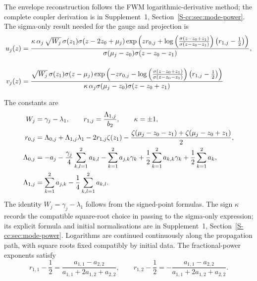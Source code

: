 \documentclass{optica-article}
\numberwithin{equation}{section}
\begin{document}
The envelope reconstruction follows the FWM logarithmic-derivative method; the complete coupler derivation is in Supplement~1, Section~\ref*{S-cc:sec:mode-power}.
The sigma-only result needed for the gauge and projection is
\begin{align}
u_j{\left(z\right)} &= \frac{\kappa\, \alpha_j\,\sqrt{W_j} \,\sigma{\left(z_1\right)}\sigma{\left(z - 2 z_{0} + {\mu}_{j} \right)} \exp\left(z {r}_{0,j} + \log{\left(\frac{\sigma{\left(z - z_{0} + z_{1} \right)}}{\sigma{\left(z - z_{0} - z_{1} \right)}} \right)} \left({r}_{1,j} - \frac{1}{2}\right)\right)}{ \sigma{\left({\mu}_{j} - z_{0}\right)} \sigma{\left(z - z_{0}  - z_1\right)}}, \notag \\[12pt]
v_j{\left(z\right)} &= \frac{\sqrt{W_j} \,  \sigma{\left(z_1\right)}\sigma{\left(z - {\mu}_{j} \right)} \exp\left(- z {r}_{0,j} - \log{\left(\frac{\sigma{\left(z - z_{0} + z_{1} \right)}}{\sigma{\left(z - z_{0} - z_{1} \right)}} \right)}  \left({r}_{1,j} - \frac{1}{2}\right) \right)}{\kappa \,\alpha_j \sigma{\left({\mu}_{j} - z_{0}\right)} \sigma{\left(z - z_{0} + z_1\right)}} \label{cc:eq:u-v-quartic-no-wp-sqrt}
\end{align}

The constants are
\begin{align}
W_j&=\gamma_j-\lambda_1,\qquad r_{1,j}=\frac{\Lambda_{1,j}}{b_2},\qquad \kappa=\pm1,\notag\\
r_{0,j}&=\Lambda_{0,j}+\Lambda_{1,j}\lambda_1-2r_{1,j}\zeta(z_1)
-\frac{\zeta(\mu_j-z_0-z_1)+\zeta(\mu_j-z_0+z_1)}2,\notag\\
\Lambda_{0,j}&=-a_j-\frac{\gamma_j}{4}\sum_{k,l=1}^2a_{k,l}
-\sum_{k=1}^2a_{j,k}\gamma_k+\frac12\sum_{k=1}^2a_{k,k}\gamma_k+\frac12\sum_{k=1}^2a_k,\notag\\
\Lambda_{1,j}&=\sum_{k=1}^2a_{j,k}-\frac14\sum_{k,l=1}^2a_{k,l}.
\label{cc:eq:envelope-constants}
\end{align}
The identity $W_j=\gamma_j-\lambda_1$ follows from the signed-point formulas.
The sign $\kappa$ records the compatible square-root choice in passing to the sigma-only expression; its explicit formula and initial normalisations are in Supplement~1, Section~\ref*{S-cc:sec:mode-power}.
Logarithms are continued continuously along the propagation path, with square roots fixed compatibly by initial data.
The fractional-power exponents satisfy
\begin{equation}
r_{1,1}-\frac12=\frac{a_{1,1}-a_{2,2}}{a_{1,1}+2a_{1,2}+a_{2,2}},\qquad
r_{1,2}-\frac12=-\frac{a_{1,1}-a_{2,2}}{a_{1,1}+2a_{1,2}+a_{2,2}}.
\label{cc:eq:branch-asymmetry}
\end{equation}
\end{document}
